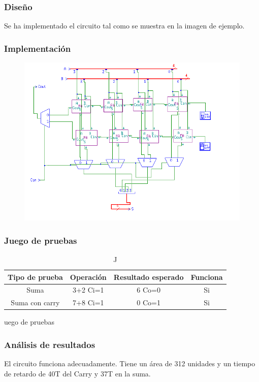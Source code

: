 \documentclass{article}
\begin{document}
		\subsubsection*{Diseño}
		Se ha implementado el circuito tal como se muestra en la imagen de ejemplo.


		\subsubsection*{Implementación}
		 \begin{figure}[ht]
		 	\includegraphics[width=0.8\linewidth]{CSA}
		 	\centering
		 \end{figure}


		\subsubsection*{Juego de pruebas}
		\begin{table}[h]
			\begin{center}
				\begin{tabular}{| c | c | c | c |}
					\hline
					Tipo de prueba & Operación & Resultado esperado & Funciona \\ \hline
				
					Suma & 3+2 Ci=1 & 6 Co=0 & Si \\ \hline
					Suma con carry & 7+8 Ci=1 & 0 Co=1 & Si \\ \hline
			
				\end{tabular}
				\caption Juego de pruebas
			\end{center}
		\end{table}



		\subsubsection*{Análisis de resultados}
		El circuito funciona adecuadamente. Tiene un área de 312 unidades y un tiempo de retardo de 40T del Carry y 37T en la suma.
\end{document}
